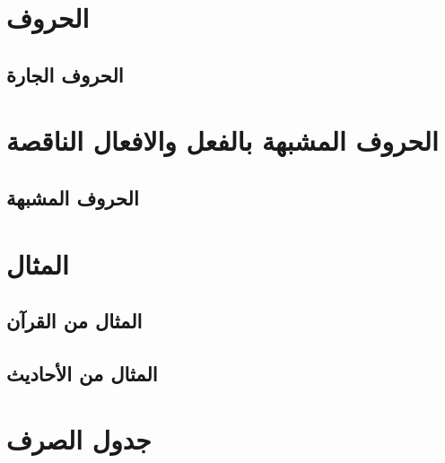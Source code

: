 \documentclass[12pt,twoside]{book}
\begin{document}


\chapter{الحروف}

\section{الحروف الجارة}



\chapter{الحروف المشبهة بالفعل والافعال الناقصة}

\section{الحروف المشبهة}



\chapter{المثال}

\section{المثال من القرآن}



\section{المثال من الأحاديث}



\appendix

\chapter{جدول الصرف}





\backmatter

\printbibliography
\end{document}
